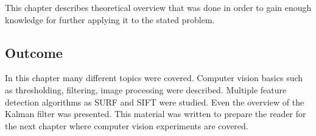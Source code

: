 \documentclass[../../main]{subfiles}
\begin{document}
This chapter describes theoretical overview that was done in order to gain enough knowledge for further applying it to the stated problem.


\newpage


\newpage

\subsection{Outcome}

In this chapter many different topics were covered. Computer vision basics such as thresholding, filtering, image processing were described. Multiple feature detection algorithms as \ac{SURF} and \ac{SIFT} were studied. Even the overview of the Kalman filter was presented. This material was written to prepare the reader for the next chapter where computer vision experiments are covered.
\end{document}
